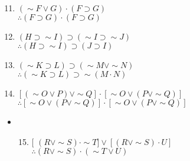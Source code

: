 \begin{enumerate}
  \setcounter{enumi}{10}
  \item $(\sim F \vee G) \cdot(F \supset G)$\\
$\therefore(F \supset G) \cdot(F \supset G)$
  \item $(H \supset \sim I) \supset(\sim I \supset \sim J)$\\
$\therefore(H \supset \sim I) \supset(J \supset I)$
  \item $(\sim K \supset L) \supset(\sim M \vee \sim N)$\\
$\therefore(\sim K \supset L) \supset \sim(M \cdot N)$
  \item $[(\sim O \vee P) \vee \sim Q] \cdot[\sim O \vee(P \vee \sim Q)]$\\
$\therefore[\sim O \vee(P \vee \sim Q)] \cdot[\sim O \vee(P \vee \sim Q)]$
\end{enumerate}

\begin{itemize}
  \item 
  \begin{enumerate}
    \setcounter{enumii}{14}
    \item \hspace{0pt} [ $(R \vee \sim S) \cdot \sim T] \vee[(R \vee \sim S) \cdot U]$\\
$\therefore(R \vee \sim S) \cdot(\sim T \vee U)$
  \end{enumerate}
\end{itemize}

